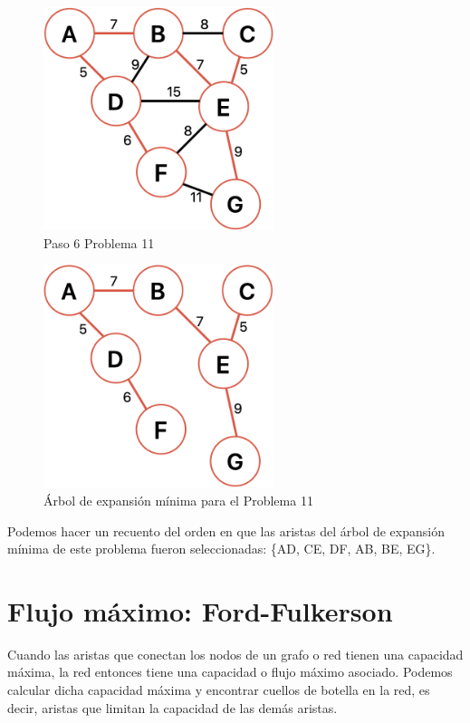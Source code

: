 \documentclass[12pt]{article}  %
\begin{document}
\begin{figure}[H]
\centering
\caption{Paso 6 Problema 11}
\label{fig:paso6Prob11}
\includegraphics[width=0.6\textwidth]{paso6Prob11.png}
\end{figure}

\begin{figure}[H]
\centering
\caption{Árbol de expansión mínima para el Problema 11}
\label{fig:solProb11}
\includegraphics[width=0.6\textwidth]{solProb11.png}
\end{figure}

Podemos hacer un recuento del orden en que las aristas del árbol de expansión mínima de este problema fueron seleccionadas: \{AD, CE, DF, AB, BE, EG\}.

\section{Flujo máximo: Ford-Fulkerson}
Cuando las aristas que conectan los nodos de un grafo o red tienen una capacidad máxima, la red entonces tiene una capacidad o flujo máximo asociado. Podemos calcular dicha capacidad máxima y encontrar cuellos de botella en la red, es decir, aristas que limitan la capacidad de las demás aristas.
\end{document}
